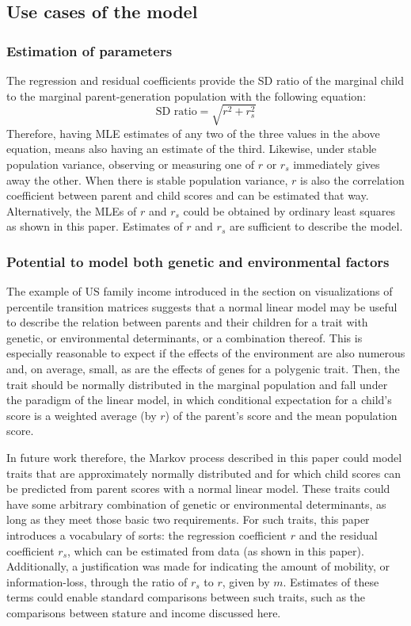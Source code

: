 \documentclass[a4paper,11pt]{article} %
\begin{document}
\subsection{Use cases of the model}

\subsubsection*{Estimation of parameters}
The regression and residual coefficients provide the SD ratio of the marginal child to the marginal parent-generation population with the following equation:
$$\mathrm{SD}\,\, \mathrm{ratio} =  \sqrt{r^2+r_s^2}$$
Therefore, having MLE estimates of any two of the three values in the above equation, means also having an estimate of the third. Likewise, under stable population variance, observing or measuring one of $r$ or $r_s$ immediately gives away the other. When there is stable population variance, $r$ is also the correlation coefficient between parent and child scores and can be estimated that way. Alternatively, the MLEs of $r$ and $r_s$ could be obtained by ordinary least squares as shown in this paper. Estimates of $r$ and $r_s$ are sufficient to describe the model.

\subsubsection*{Potential to model both genetic and environmental factors}

The example of US family income introduced in the section on visualizations of percentile transition matrices suggests that a normal linear model may be useful to describe the relation between parents and their children for a trait with genetic, or environmental determinants, or a combination thereof. This is especially reasonable to expect if the effects of the environment are also numerous and, on average, small, as are the effects of genes for a polygenic trait. Then, the trait should be normally distributed in the marginal population and fall under the paradigm of the linear model, in which conditional expectation for a child's score is a weighted average (by $r$) of the parent's score and the mean population score. 

In future work therefore, the Markov process described in this paper could model traits that are approximately normally distributed and for which child scores can be predicted from parent scores with a normal linear model. These traits could have some arbitrary combination of genetic or environmental determinants, as long as they meet those basic two requirements. For such traits, this paper introduces a vocabulary of sorts: the regression coefficient $r$ and the residual coefficient $r_s$, which can be estimated from data (as shown in this paper). Additionally, a justification was made for indicating the amount of mobility, or information-loss, through the ratio of $r_s$ to $r$, given by $m$. Estimates of these terms could enable standard comparisons between such traits, such as the comparisons between stature and income discussed here. 
\end{document}
